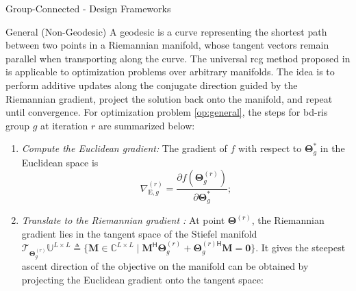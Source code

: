 \documentclass[journal]{IEEEtran}
\begin{document}
\begin{section}{Group-Connected - Design Frameworks}
	\begin{subsection}{General (Non-Geodesic) }
		A geodesic is a curve representing the shortest path between two points in a Riemannian manifold, whose tangent vectors remain parallel when transporting along the curve.
		The universal \gls{rcg} method proposed in \cite{Absil2009,Pan2022d} is applicable to optimization problems over arbitrary manifolds.
		The idea is to perform {additive} updates along the conjugate direction guided by the Riemannian gradient, {project} the solution back onto the manifold, and repeat until convergence.
		For optimization problem \eqref{op:general}, the steps for \gls{bd}-\gls{ris} group $g$ at iteration $r$ are summarized below:
		\begin{enumerate}
			\item \emph{Compute the Euclidean gradient:} The gradient of $f$ with respect to $\mathbf{\Theta}_g^*$ in the Euclidean space is
			\begin{equation}
				\nabla_{\mathrm{E},g}^{(r)} = \frac{\partial f(\mathbf{\Theta}_g^{(r)})}{\partial \mathbf{\Theta}_g^*};
				\label{eq:gradient_euclidean}
			\end{equation}
			\item \emph{Translate to the Riemannian gradient \cite{Absil2009}:} At point $\mathbf{\Theta}^{(r)}$, the Riemannian gradient lies in the tangent space of the Stiefel manifold $\mathcal{T}_{\mathbf{\Theta}_g^{(r)}}\mathbb{U}^{L \times L} \triangleq \{\mathbf{M} \in \mathbb{C}^{L \times L} \mid \mathbf{M}^\mathsf{H} \mathbf{\Theta}_g^{(r)} + {\mathbf{\Theta}_g^{(r)\mathsf{H}}} \mathbf{M} = \mathbf{0}\}$. It gives the steepest ascent direction of the objective on the manifold can be obtained by projecting the Euclidean gradient onto the tangent space:
			\begin{equation}

\end{equation}
\end{enumerate}
\end{subsection}
\end{section}
\end{document}
